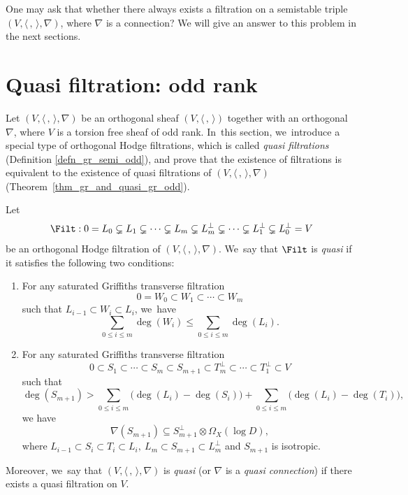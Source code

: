 One may ask that whether there always exists a \grsemistable filtration on a semistable triple $(V, \langle \,,\, \rangle,\nabla)$, where $\nabla$ is a connection? We will give an answer to this problem in the next sections.

\section{Quasi \texorpdfstring{\protect\grsemistable}{grsemistable} filtration: odd rank}\label{sect_odd}

Let $(V, \langle \,, \, \rangle, \nabla)$ be an orthogonal sheaf $(V, \langle \,, \, \rangle)$ together with an orthogonal \lconnection $\nabla$, where $V$ is a torsion free sheaf of odd rank. In~this section, we~introduce a special type of orthogonal Hodge filtrations, which is called \emph{quasi \grsemistable filtrations} (Definition \ref{defn_gr_semi_odd}), and prove that the existence of \grsemistable filtrations is equivalent to the existence of quasi \grsemistable filtrations of $(V, \langle \,, \, \rangle, \nabla)$ (Theorem~\ref{thm_gr_and_quasi_gr_odd}).


\begin{defn}\label{defn_gr_semi_odd}
Let
\[
\Filt: 0= L_0 \subsetneq L_1 \subsetneq \cdots \subsetneq L_m \subsetneq L_m^\perp\subsetneq\cdots \subsetneq L_1^\perp\subsetneq L_0^\perp= V
\]
be an orthogonal Hodge filtration of $(V, \langle \,, \, \rangle, \nabla)$. We~say that $\Filt$ is \emph{quasi \grsemistable} if it satisfies the following two conditions:

\begin{enumerate}\renewcommand{\theenumi}{\Roman{enumi}}
\item\label{cond:I}
For any saturated Griffiths transverse filtration
\[
0=W_0\subset W_1 \subset \cdots\subset W_m
\]
such that $L_{i-1}\subset W_i\subset L_i$, we~have
\[
\sum_{0\leq i\leq m}\deg(W_i)\leqslant\sum_{0\leq i\leq m}\deg(L_i).
\]

\item\label{cond:II}
For any saturated Griffiths transverse filtration
\[
0\subset S_1 \subset \cdots\subset S_m\subset S_{m+1}\subset T_m^\perp\subset\cdots \subset T_1^\perp\subset V
\]
such that
\[
\deg(S_{m+1})>\sum_{0\leq i\leq m}\big(\deg(L_i)-\deg(S_i)\big)+\sum_{0\leq i\leq m}\big(\deg(L_i)-\deg(T_i)\big),
\]
we have
\[
\nabla(S_{m+1})\subseteq S_{m+1}^\perp \otimes\Omega_X(\log D),
\]
where $L_{i-1}\subset S_i \subset T_i \subset L_i,\ L_m\subset S_{m+1}\subset L_m^\perp$ and $S_{m+1}$ is isotropic.
\end{enumerate}
Moreover, we~say that $(V,\langle \,, \, \rangle,\nabla)$ is \emph{quasi \grsemistable} (or $\nabla$ is a \emph{quasi \grsemistable connection}) if there exists a quasi \grsemistable filtration on $V$.
\end{defn}

